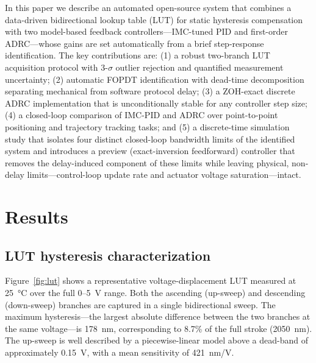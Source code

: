 \documentclass[fleqn,10pt]{wlscirep}
\begin{document}
In this paper we describe an automated open-source system that combines a data-driven bidirectional lookup table (LUT) for static hysteresis compensation with two model-based feedback controllers---IMC-tuned PID and first-order ADRC---whose gains are set automatically from a brief step-response identification. The key contributions are: (1) a robust two-branch LUT acquisition protocol with 3-$\sigma$ outlier rejection and quantified measurement uncertainty; (2) automatic FOPDT identification with dead-time decomposition separating mechanical from software protocol delay; (3) a ZOH-exact discrete ADRC implementation that is unconditionally stable for any controller step size; (4) a closed-loop comparison of IMC-PID and ADRC over point-to-point positioning and trajectory tracking tasks; and (5) a discrete-time simulation study that isolates four distinct closed-loop bandwidth limits of the identified system and introduces a preview (exact-inversion feedforward) controller that removes the delay-induced component of these limits while leaving physical, non-delay limits---control-loop update rate and actuator voltage saturation---intact.


\section*{Results}

\subsection*{LUT hysteresis characterization}

Figure~\ref{fig:lut} shows a representative voltage-displacement LUT measured at \SI{25}{\celsius} over the full 0--\SI{5}{V} range. Both the ascending (up-sweep) and descending (down-sweep) branches are captured in a single bidirectional sweep. The maximum hysteresis---the largest absolute difference between the two branches at the same voltage---is \SI{178}{nm}, corresponding to 8.7\% of the full stroke (\SI{2050}{nm}). The up-sweep is well described by a piecewise-linear model above a dead-band of approximately \SI{0.15}{V}, with a mean sensitivity of \SI{421}{nm/V}.
\end{document}
